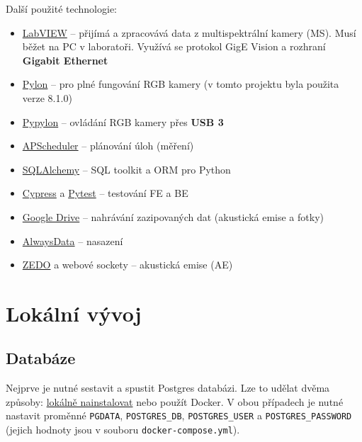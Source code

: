 \documentclass[12pt]{article}
\begin{document}
\begin{teamwork}
        Další použité technologie:

        \begin{itemize}
            \item \href{https://www.ni.com/en/shop/labview.html}{LabVIEW} – přijímá a zpracovává data z multispektrální kamery (MS). Musí běžet na PC v laboratoři.
            Využívá se protokol GigE Vision a rozhraní \textbf{Gigabit Ethernet}
            \item \href{https://www.baslerweb.com/en/downloads/software/?downloadCategory.values.label.data=pylon}{Pylon} – pro plné fungování RGB kamery (v tomto projektu byla použita verze 8.1.0)
            \item \href{https://github.com/basler/pypylon}{Pypylon} – ovládání RGB kamery přes \textbf{USB 3}
            \item \href{https://github.com/agronholm/apscheduler}{APScheduler} – plánování úloh (měření)
            \item \href{https://www.sqlalchemy.org/}{SQLAlchemy} – SQL toolkit a ORM pro Python
            \item \href{https://www.cypress.io/}{Cypress} a \href{https://docs.pytest.org/en/stable/}{Pytest} – testování FE a BE
            \item \href{https://workspace.google.com/products/drive/}{Google Drive} – nahrávání zazipovaných dat (akustická emise a fotky)
            \item \href{https://www.alwaysdata.com/en/}{AlwaysData} – nasazení
            \item \href{http://dakel.cz/index.php?pg=prod/dev/zedo_en}{ZEDO} a webové sockety – akustická emise (AE)
        \end{itemize}

        \section{Lokální vývoj}\label{sec:lokalni-vyvoj}

        \subsection{Databáze}\label{subsec:databaze}

        Nejprve je nutné sestavit a spustit Postgres databázi.
        Lze to udělat dvěma způsoby: \href{https://www.postgresql.org/download/}{lokálně nainstalovat} nebo použít Docker.
        V obou případech je nutné nastavit proměnné \texttt{PGDATA}, \texttt{POSTGRES\_DB}, \texttt{POSTGRES\_USER} a \texttt{POSTGRES\_PASSWORD} (jejich hodnoty jsou v souboru \texttt{docker-compose.yml}).


\end{teamwork}
\end{document}
